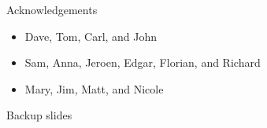 \documentclass[xcolor=dvipsnames]{beamer}
\theoremstyle{plain}
\begin{document}
  \begin{frame}{Acknowledgements}
    \begin{itemize}
      \item
        Dave, Tom, Carl, and John
      \item
        Sam, Anna, Jeroen, Edgar, Florian, and Richard
      \item
        Mary, Jim, Matt, and Nicole
    \end{itemize}
  \end{frame}
  \appendix
  \begin{frame}{Backup slides}
  \end{frame}
\end{document}

